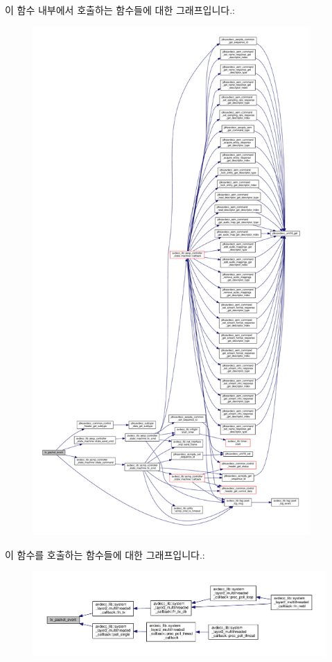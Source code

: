 이 함수 내부에서 호출하는 함수들에 대한 그래프입니다.\+:
\nopagebreak
\begin{figure}[H]
\begin{center}
\leavevmode
\includegraphics[height=550pt]{classavdecc__lib_1_1controller__imp_a925e4ecb60a5e6afb6b8f99997ed0f35_cgraph}
\end{center}
\end{figure}




이 함수를 호출하는 함수들에 대한 그래프입니다.\+:
\nopagebreak
\begin{figure}[H]
\begin{center}
\leavevmode
\includegraphics[width=350pt]{classavdecc__lib_1_1controller__imp_a925e4ecb60a5e6afb6b8f99997ed0f35_icgraph}
\end{center}
\end{figure}




